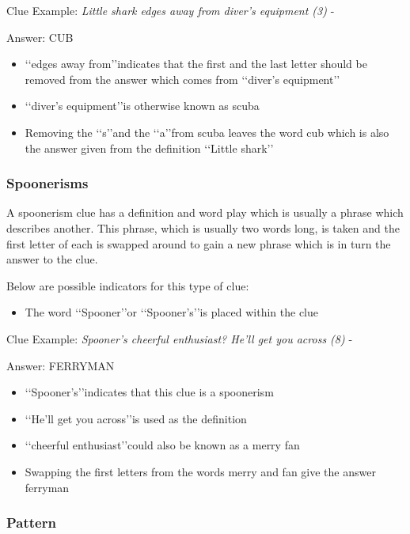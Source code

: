 Clue Example: \emph{Little shark edges away from diver's equipment (3)}  - \citep{shuchiDeletions09}  

Answer: CUB 

\begin{itemize}
	\item \lq\lq edges away from\rq\rq indicates that the first and the last letter should be removed from the answer which comes from \lq\lq diver’s equipment\rq\rq
	\item \lq\lq diver’s equipment\rq\rq is otherwise known as scuba  
	\item Removing the \lq\lq s\rq\rq and the \lq\lq a\rq\rq from scuba leaves the word cub which is also the answer given from the definition \lq\lq Little shark\rq\rq
\end{itemize}

\subsubsection{Spoonerisms}

A spoonerism clue has a definition and word play which is usually a phrase which describes another. This phrase, which is usually two words long, is taken and the first letter of each is swapped around to gain a new phrase which is in turn the answer to the clue.  

Below are possible indicators for this type of clue:
\begin{itemize} 
	\item The word \lq\lq Spooner\rq\rq or \lq\lq Spooner’s\rq\rq is placed within the clue
\\ 
\end{itemize}

Clue Example: \emph{Spooner's cheerful enthusiast? He'll get you across (8)} - \citep{connorSpoon12}

Answer: FERRYMAN 

\begin{itemize}
	\item \lq\lq Spooner’s\rq\rq indicates that this clue is a spoonerism 
	\item \lq\lq He’ll get you across\rq\rq is used as the definition 
	\item \lq\lq cheerful enthusiast\rq\rq could also be known as a merry fan 
	\item Swapping the first letters from the words merry and fan give the answer ferryman 
\end{itemize}

\subsubsection{Pattern}

